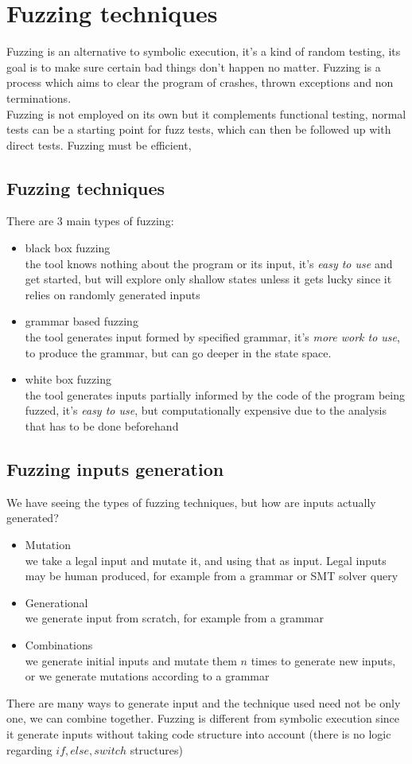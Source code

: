 \documentclass[11pt, oneside]{article}   	%
\begin{document}
\section*{Fuzzing techniques}
Fuzzing is an alternative to symbolic execution, it's a kind of random testing, its goal is to make sure certain bad things don't happen no matter. Fuzzing is a process which aims to clear the program of crashes, thrown exceptions and non terminations.\\

Fuzzing is not employed on its own but it complements functional testing, normal tests can be a starting point for fuzz tests, which can then be followed up with direct tests.
Fuzzing must be efficient, 
\subsection*{Fuzzing techniques}
There are 3 main types of fuzzing:
\begin{itemize}
\item black box fuzzing\\
the tool knows nothing about the program or its input, it's \emph{easy to use} and get started, but will explore only shallow states unless it gets lucky since it relies on randomly generated inputs
\item grammar based fuzzing\\
the tool generates input formed by specified grammar, it's \emph{more work to use}, to produce the grammar, but can go deeper in the state space. 
\item white box fuzzing\\
the tool generates inputs partially informed by the code of the program being fuzzed, it's \emph{easy to use}, but computationally expensive due to the analysis that has to be done beforehand
\end{itemize}

\subsection*{Fuzzing inputs generation}
We have seeing the types of fuzzing techniques, but how are inputs actually generated?
\begin{itemize}
\item Mutation\\
we take a legal input and mutate it, and using that as input. Legal inputs may be human produced, for example from a grammar or SMT solver query
\item Generational\\
we generate input from scratch, for example from a grammar
\item Combinations\\
we generate initial inputs and mutate them $n$ times to generate new inputs, or we generate mutations according to a grammar
\end{itemize}
There are many ways to generate input and the technique used need not be only one, we can combine together. Fuzzing is different from symbolic execution since it generate inputs without taking code structure into account (there is no logic regarding $if, else, switch$ structures)
\end{document}
